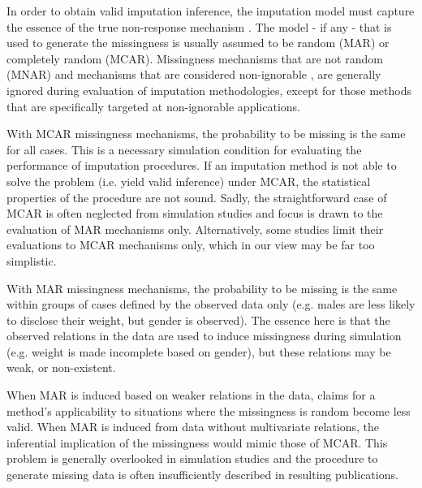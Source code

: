 \documentclass[bimj,fleqn]{w-art}
\theoremstyle{plain}
\theoremstyle{definition}
\begin{document}


In order to obtain valid imputation inference, the imputation model must capture the essence of the true non-response mechanism \citep{meng94}. The model - if any - that is used to generate the missingness is usually assumed to be random (MAR) or completely random (MCAR). Missingness mechanisms that are not random (MNAR) and mechanisms that are considered non-ignorable \citep[see e.g.][]{rubi76}, are generally ignored during evaluation of imputation methodologies, except for those methods that are specifically targeted at non-ignorable applications.

With MCAR missingness mechanisms, the probability to be missing is the same for all cases. This is a necessary simulation condition for evaluating the performance of imputation procedures. If an imputation method is not able to solve the problem (i.e. yield valid inference) under MCAR, the statistical properties of the procedure are not sound. Sadly, the straightforward case of MCAR is often neglected from simulation studies and focus is drawn to the evaluation of MAR mechanisms only. Alternatively, some studies limit their evaluations to MCAR mechanisms only, which in our view may be far too simplistic. 

With MAR missingness mechanisms, the probability to be missing is the same within groups of cases defined by the observed data only (e.g. males are less likely to disclose their weight, but gender is observed). The essence here is that the observed relations in the data are used to induce missingness during simulation (e.g. weight is made incomplete based on gender), but these relations may be weak, or non-existent. 

When MAR is induced based on weaker relations in the data, claims for a method's applicability to situations where the missingness is random become less valid. When MAR is induced from data without multivariate relations, the inferential implication of the missingness would mimic those of MCAR. This problem is generally overlooked in simulation studies and the procedure to generate missing data is often insufficiently described in resulting publications. 
\end{document}
